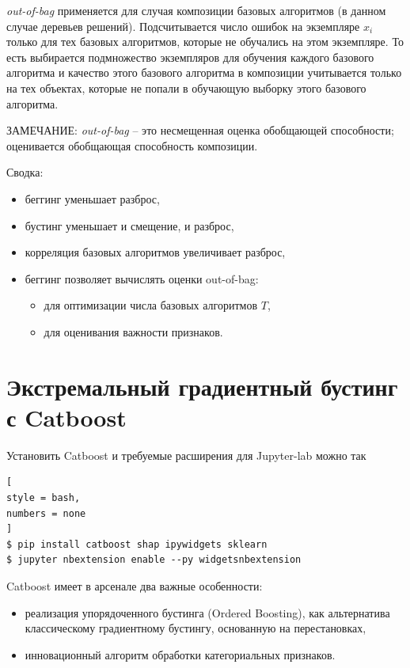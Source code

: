 \documentclass[%
	11pt,
	a4paper,
	utf8,
		]{article}
\begin{document}
\emph{out-of-bag} применяется для случая композиции базовых алгоритмов (в данном случае деревьев решений). Подсчитывается число ошибок на экземпляре $ x_i $ только для тех базовых алгоритмов, которые не обучались на этом экземпляре. То есть выбирается подмножество экземпляров для обучения каждого базового алгоритма и качество этого базового алгоритма в композиции учитывается только на тех объектах, которые не попали в обучающую выборку этого базового алгоритма.

ЗАМЕЧАНИЕ: \emph{out-of-bag} -- это несмещенная оценка обобщающей способности; оценивается обобщающая способность композиции.

Сводка:
\begin{itemize}
	\item беггинг уменьшает разброс,
	
	\item бустинг уменьшает и смещение, и разброс,
	
	\item корреляция базовых алгоритмов увеличивает разброс,
	
	\item беггинг позволяет вычислять оценки out-of-bag:
	\begin{itemize}
		\item для оптимизации числа базовых алгоритмов $ T $,
		
		\item для оценивания важности признаков.
	\end{itemize}
\end{itemize}


\section{Экстремальный градиентный бустинг с Catboost}

Установить Catboost и требуемые расширения для Jupyter-lab можно так
\begin{lstlisting}[
style = bash,
numbers = none	
]
$ pip install catboost shap ipywidgets sklearn
$ jupyter nbextension enable --py widgetsnbextension
\end{lstlisting}

Catboost имеет в арсенале два важные особенности:
\begin{itemize}
	\item реализация упорядоченного бустинга (Ordered Boosting), как альтернатива классическому градиентному бустингу, основанную на перестановках,
	
	\item инновационный алгоритм обработки категориальных признаков.
\end{itemize}
\end{document}
